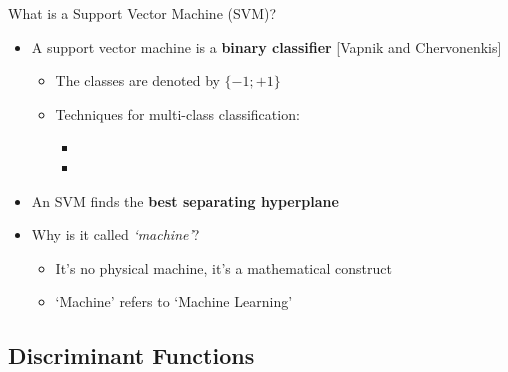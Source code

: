 \begin{frame}{What is a Support Vector Machine (SVM)?}{}
	\begin{itemize}
		\item A support vector machine is a \textbf{binary classifier}
			{\footnotesize [Vapnik and Chervonenkis]}
		\begin{itemize}
			\item The classes are denoted by $\{-1; +1\}$
			\item Techniques for multi-class classification:
			\begin{itemize}
				\item {}
				\item {}
			\end{itemize}
		\end{itemize}
		\item An SVM finds the \textbf{best separating hyperplane}
		\item Why is it called \textit{`machine'}?
		\begin{itemize}
			\item It's no physical machine, it's a mathematical construct \\
			\item `Machine' refers to `Machine Learning' 
		\end{itemize}
	\end{itemize}
\end{frame}


\subsection{Discriminant Functions}

